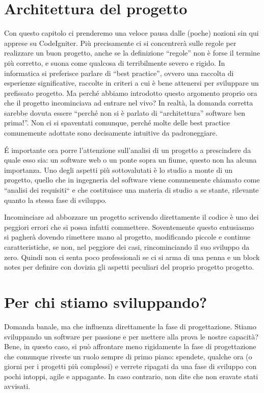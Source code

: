 \section{Architettura del progetto}
\label{cap:architettura}

Con questo capitolo ci prenderemo una veloce pausa dalle (poche) nozioni sin qui apprese su CodeIgniter. Più precisamente ci si concentrerà sulle regole per realizzare un buon progetto, anche se la definizione ``regole'' non è forse il termine più corretto, e suona come qualcosa di terribilmente severo e rigido. In informatica si preferisce parlare di ``best practice'', ovvero una raccolta di esperienze significative, raccolte in criteri a cui è bene attenersi per sviluppare un prefissato progetto. Ma perché abbiamo introdotto questo argomento proprio ora che il progetto incominciava ad entrare nel vivo? In realtà, la domanda corretta sarebbe dovuta essere ``perché non si è parlato di ``architettura'' software ben prima!''. Non ci si spaventati comunque, perché molte delle best practice comunemente adottate sono decisamente intuitive da padroneggiare.

\'E importante ora porre l'attenzione sull'analisi di un progetto a prescindere da quale esso sia: un software web o un ponte sopra un fiume, questo non ha alcuna importanza. Uno degli aspetti più sottovalutati è lo studio a monte di un progetto, quello che in ingegneria del software viene comunemente chiamato come ``analisi dei requisiti`` e che costituisce una materia di studio a se stante, rilevante quanto la stessa fase di sviluppo.

Incominciare ad abbozzare un progetto scrivendo direttamente il codice è uno dei peggiori errori che si possa infatti commettere. Soventemente questo entusiasmo si pagherà dovendo rimettere mano al progetto, modificando piccole e continue caratteristiche, se non, nel peggiore dei casi, rincominciando il suo sviluppo da zero. Quindi non ci senta poco professionali se ci si arma di una penna e un block notes per definire con dovizia gli aspetti peculiari del proprio progetto progetto.

\section*{Per chi stiamo sviluppando?}
Domanda banale, ma che influenza direttamente la fase di progettazione. Stiamo sviluppando un software per passione e per mettere alla prova le nostre capacità? Bene, in questo caso, si può affrontare meno rigidamente la fase di progettazione che comunque riveste un ruolo sempre di primo piano: spendete, qualche ora (o giorni per i progetti più complessi) e verrete ripagati da una fase di sviluppo con pochi intoppi, agile e appagante. In caso contrario, non dite che non eravate stati avvisati.

